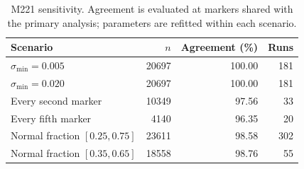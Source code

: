 \begin{table}[htbp]
\centering
\small
\caption{M221 sensitivity. Agreement is evaluated at markers shared with the primary analysis; parameters are refitted within each scenario.}
\label{tab:si-genomic-sensitivity}
\begin{tabular}{lrrr}
\toprule
Scenario & $n$ & Agreement (\%) & Runs \\
\midrule
$\sigma_{\min}=0.005$ & 20697 & 100.00 & 181 \\
$\sigma_{\min}=0.020$ & 20697 & 100.00 & 181 \\
Every second marker & 10349 & 97.56 & 33 \\
Every fifth marker & 4140 & 96.35 & 20 \\
Normal fraction $[0.25,0.75]$ & 23611 & 98.58 & 302 \\
Normal fraction $[0.35,0.65]$ & 18558 & 98.76 & 55 \\
\bottomrule
\end{tabular}
\end{table}
